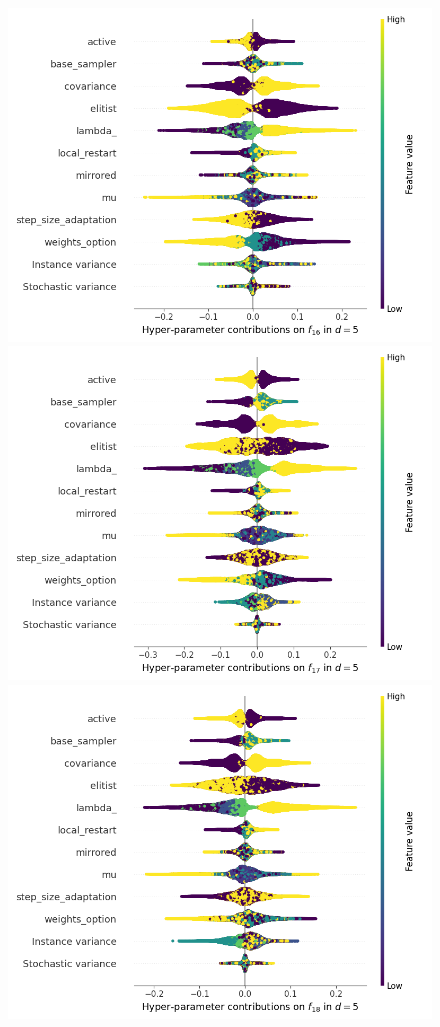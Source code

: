 \begin{figure}[t]
	\includegraphics[height=0.15\textheight,trim=60mm 0mm 0mm 0mm,clip]{cma_img_new/img_summary_f16_d5.png}
	\includegraphics[height=0.15\textheight,trim=0mm 0mm 30mm 0mm,clip]{cma_img_new/img_summary_f17_d5.png}
	\includegraphics[height=0.15\textheight,trim=60mm 0mm 30mm 0mm,clip]{cma_img_new/img_summary_f18_d5.png}

\end{figure}
